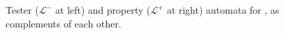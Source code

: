 \begin{figure}[H]\centering
{}
\caption{Tester ($\mathcal{L}^{-}$ at left) and property ($\mathcal{L}^{+}$ at right) automata for , as complements of each other.\label{image:tester-and-property-automata}}
\end{figure}

